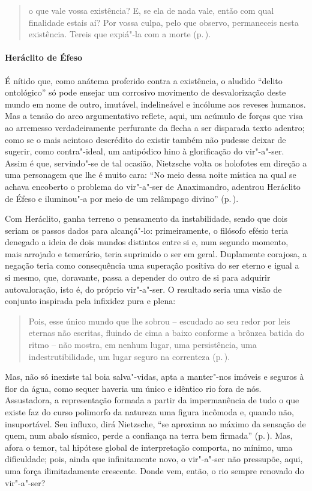 \begin{quote} 
o que vale vossa existência? E, se ela de nada vale, então
 com qual finalidade estais aí? Por vossa culpa, pelo que observo,
 permaneceis nesta existência. Tereis que expiá"-la com a morte 
 (p.\,\pageref{oquevale}).
\end{quote} 

\paragraph{Heráclito de Éfeso} É nítido que, como anátema proferido contra a
 existência, o aludido ``delito ontológico'' só pode ensejar um corrosivo
 movimento de desvalorização deste mundo em nome de outro, imutável,
 indelineável e incólume aos reveses humanos. Mas a tensão do arco
 argumentativo reflete, aqui, um acúmulo de forças que visa ao arremesso
 verdadeiramente perfurante da flecha a ser disparada texto adentro; como se
 o mais acintoso descrédito do existir também não pudesse deixar de sugerir,
 como contra"-ideal, um antipódico hino à glorificação do vir"-a"-ser. Assim
 é que, servindo"-se de tal ocasião, Nietzsche volta os holofotes em direção
 a uma personagem que lhe é muito cara: ``No meio dessa noite mística na qual
 se achava encoberto o problema do vir"-a"-ser de Anaximandro, adentrou
 Heráclito de Éfeso e iluminou"-a por meio de um relâmpago divino''
 (p.\,\pageref{noitemistica}).

Com Heráclito, ganha terreno o pensamento da instabilidade, sendo que dois
seriam os passos dados para alcançá"-lo: primeiramente, o filósofo efésio
teria denegado a ideia de dois mundos distintos entre si e, num segundo
momento, mais arrojado e temerário, teria suprimido o ser em geral.
Duplamente corajosa, a negação teria como consequência uma superação positiva
do ser eterno e igual a si mesmo, que, doravante, passa a depender do outro
de si para adquirir autovaloração, isto é, do próprio vir"-a"-ser. O
resultado seria uma visão de conjunto inspirada pela infixidez pura e
plena: 

\begin{quote} 
Pois, esse único mundo que lhe sobrou -- escudado ao seu
 redor por leis eternas não escritas, fluindo de cima a baixo conforme a
 brônzea batida do ritmo -- não mostra, em nenhum lugar, uma persistência,
 uma indestrutibilidade, um lugar seguro na correnteza (p.\,\pageref{esseunicomundo}).
\end{quote} 

Mas, não só inexiste tal boia salva"-vidas, apta a manter"-nos imóveis e
seguros à flor da água, como sequer haveria um único e idêntico rio fora de
nós. Assustadora, a representação formada a partir da impermanência de tudo o
que existe faz do curso polimorfo da natureza uma figura incômoda e, quando
não, insuportável. Seu influxo, dirá Nietzsche, ``se aproxima ao máximo da
sensação de quem, num abalo sísmico, perde a confiança na terra bem
firmada'' (p.\,\pageref{abalosismico}). Mas, afora o temor, tal hipótese
global de interpretação comporta, no mínimo, uma dificuldade; pois, ainda que
infinitamente novo, o vir"-a"-ser não pressupõe, aqui, uma força
ilimitadamente crescente. Donde vem, então, o rio sempre renovado do
vir"-a"-ser? 

